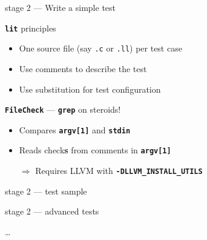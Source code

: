 \documentclass[14pt]{beamer}
\newcommand{\Command}[1]{\textbf{\texttt{#1}}}
\newcommand{\Code}[1]{\textbf{\texttt{#1}}}
\begin{document}
    \begin{frame}{stage 2 --- Write a simple test}
        \begin{alertblock}{\Command{lit} principles}
            \begin{itemize}
                \item One source file (say \texttt{.c} or \texttt{.ll}) per test case
                \item Use comments to describe the test
                \item Use substitution for test configuration
            \end{itemize}
        \end{alertblock}

        \begin{block}{\Command{FileCheck} --- \Command{grep} on steroids!}
            \begin{itemize}
                \item Compares \Code{argv[1]} and \Code{stdin}
                \item Reads check\textbf{s} from comments in \Code{argv[1]}
                \item[$\Rightarrow$] Requires LLVM with \Code{-DLLVM\_INSTALL\_UTILS}
            \end{itemize}
        \end{block}
    \end{frame}

    \begin{frame}[containsverbatim]{stage 2 --- test sample}
    \hspace{-1em}\begin{minipage}{\textwidth}
            \footnotesize
            
        \end{minipage}
    \end{frame}

    \begin{frame}[containsverbatim]{stage 2 --- advanced tests}
    \hspace{-1em}\begin{minipage}{\textwidth}
            \footnotesize
            
            \dots
            
        \end{minipage}
    \end{frame}
\end{document}
